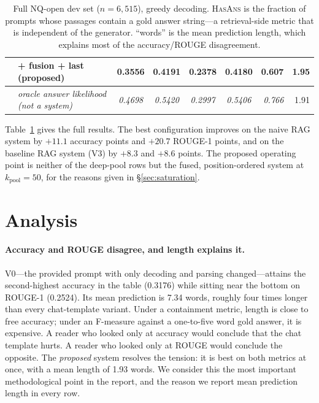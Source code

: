 \documentclass[11pt]{article}
\begin{document}
\begin{table}[t]
\begin{tabular}{@{}llccccrr@{}}
& \quad + fusion + last \textbf{(proposed)} & \textbf{0.3556} & \textbf{0.4191} & \textbf{0.2378} & \textbf{0.4180} & 0.607 & 1.95 \\
\midrule
& \emph{oracle answer likelihood (not a system)} & \emph{0.4698} & \emph{0.5420} & \emph{0.2997} & \emph{0.5406} & \emph{0.766} & 1.91 \\
\bottomrule
\end{tabular}
\caption{Full NQ-open dev set ($n=6{,}515$), greedy decoding. \textsc{HasAns} is the fraction
of prompts whose passages contain a gold answer string---a retrieval-side metric that is
independent of the generator. ``words'' is the mean prediction length, which explains most of
the accuracy/ROUGE disagreement.}
\label{tab:main}
\end{table}

Table~\ref{tab:main} gives the full results. The best configuration improves on the naive RAG
system by $+11.1$ accuracy points and $+20.7$ ROUGE-1 points, and on the baseline RAG system
(\textsc{V3}) by $+8.3$ and $+8.6$ points. The proposed operating point is neither of the
deep-pool rows but the fused, position-ordered system at $k_{\text{pool}}{=}50$, for the
reasons given in \S\ref{sec:saturation}.

\section{Analysis}

\paragraph{Accuracy and ROUGE disagree, and length explains it.} \textsc{V0}---the provided
prompt with only decoding and parsing changed---attains the second-highest accuracy in the
table (0.3176) while sitting near the bottom on ROUGE-1 (0.2524). Its mean prediction is 7.34
words, roughly four times longer than every chat-template variant. Under a containment
metric, length is close to free accuracy; under an F-measure against a one-to-five word gold
answer, it is expensive. A reader who looked only at accuracy would conclude that the chat
template hurts. A reader who looked only at ROUGE would conclude the opposite. The
\emph{proposed} system resolves the tension: it is best on both metrics at once, with a mean
length of 1.93 words. We consider this the most important methodological point in the report,
and the reason we report mean prediction length in every row.
\end{document}
